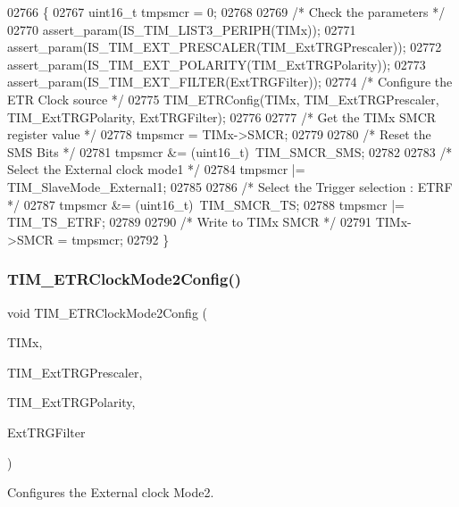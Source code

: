 \begin{DoxyCode}
02766 \{
02767   uint16\_t tmpsmcr = 0;
02768 
02769   \textcolor{comment}{/* Check the parameters */}
02770   assert_param(IS_TIM_LIST3_PERIPH(TIMx));
02771   assert_param(IS_TIM_EXT_PRESCALER(TIM\_ExtTRGPrescaler));
02772   assert_param(IS_TIM_EXT_POLARITY(TIM\_ExtTRGPolarity));
02773   assert_param(IS_TIM_EXT_FILTER(ExtTRGFilter));
02774   \textcolor{comment}{/* Configure the ETR Clock source */}
02775   TIM_ETRConfig(TIMx, TIM\_ExtTRGPrescaler, TIM\_ExtTRGPolarity, ExtTRGFilter);
02776   
02777   \textcolor{comment}{/* Get the TIMx SMCR register value */}
02778   tmpsmcr = TIMx->SMCR;
02779 
02780   \textcolor{comment}{/* Reset the SMS Bits */}
02781   tmpsmcr &= (uint16\_t)~TIM_SMCR_SMS;
02782 
02783   \textcolor{comment}{/* Select the External clock mode1 */}
02784   tmpsmcr |= TIM_SlaveMode_External1;
02785 
02786   \textcolor{comment}{/* Select the Trigger selection : ETRF */}
02787   tmpsmcr &= (uint16\_t)~TIM_SMCR_TS;
02788   tmpsmcr |= TIM_TS_ETRF;
02789 
02790   \textcolor{comment}{/* Write to TIMx SMCR */}
02791   TIMx->SMCR = tmpsmcr;
02792 \}
\end{DoxyCode}
\mbox{\label{group__TIM__Group6_ga0a9cbcbab32326cbbdaf4c111f59ec20}} 
\subsubsection{T\+I\+M\+\_\+\+E\+T\+R\+Clock\+Mode2\+Config()}
{\footnotesize\ttfamily void T\+I\+M\+\_\+\+E\+T\+R\+Clock\+Mode2\+Config (\begin{DoxyParamCaption}\item[{\textbf{ T\+I\+M\+\_\+\+Type\+Def} $\ast$}]{T\+I\+Mx,  }\item[{uint16\+\_\+t}]{T\+I\+M\+\_\+\+Ext\+T\+R\+G\+Prescaler,  }\item[{uint16\+\_\+t}]{T\+I\+M\+\_\+\+Ext\+T\+R\+G\+Polarity,  }\item[{uint16\+\_\+t}]{Ext\+T\+R\+G\+Filter }\end{DoxyParamCaption})}



Configures the External clock Mode2. 



